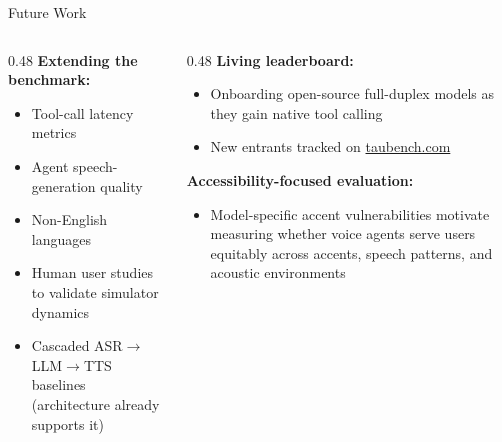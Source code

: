 \documentclass[aspectratio=169]{beamer}
\begin{document}

\begin{frame}{Future Work}

  \begin{columns}[T]
    \begin{column}{0.48\textwidth}
      \textbf{Extending the benchmark:}
      \begin{itemize}
        \item Tool-call latency metrics
        \item Agent speech-generation quality
        \item Non-English languages
        \item Human user studies to validate simulator dynamics
        \item Cascaded ASR$\rightarrow$LLM$\rightarrow$TTS baselines (architecture already supports it)
      \end{itemize}
    \end{column}
    \begin{column}{0.48\textwidth}
      \textbf{Living leaderboard:}
      \begin{itemize}
        \item Onboarding open-source full-duplex models as they gain native tool calling
        \item New entrants tracked on \href{https://taubench.com}{\textcolor{SierraGreen}{taubench.com}}
      \end{itemize}

      \vspace{0.6em}
      \textbf{Accessibility-focused evaluation:}
      \begin{itemize}
        \item Model-specific accent vulnerabilities motivate measuring whether voice agents serve users equitably across accents, speech patterns, and acoustic environments
      \end{itemize}
    \end{column}
  \end{columns}

\end{frame}

\end{document}
